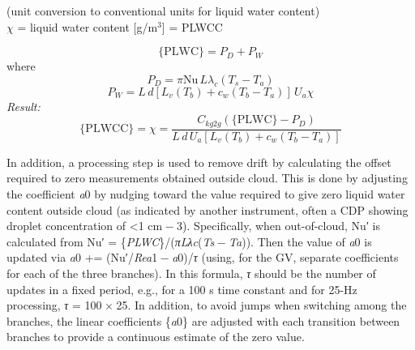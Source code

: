\documentclass[
]{book}
\begin{document}
\hspace*{0.333em}\hspace*{0.333em}\hspace*{0.333em}\hspace*{0.333em}\hspace*{0.333em}\hspace*{0.333em}\hspace*{0.333em}\hspace*{0.333em}\hspace*{0.333em}\hspace*{0.333em}(unit conversion to conventional units for liquid water content)\\
\(\chi\) = liquid water
content {[}g/m\(^{3}\){]} = PLWCC

\begin{equation}
\mathrm{\{PLWC\}} = P_{D}+P_{W}
\label{eq:PLWCa}
\end{equation}
where\\
\begin{equation}
P_{D}=\pi\mathrm{Nu}\,L\lambda_{c}(T_{s}-T_{a})
\label{eq:PLWCb}
\end{equation}
\begin{equation}
P_{W}=L\,d[L_{v}(T_{b})+c_{w}(T_{b}-T_{a})]\,U_{a}\chi
\label{eq:PLWCc}
\end{equation}
\emph{Result:}\\
\begin{equation}
\mathrm{\{PLWCC\}}=\chi=\frac{C_{kg2g}(\mathrm{\{PLWC\}}-P_{D})}{L\,d\,U_{a}[L_{v}(T_{b})+c_{w}(T_{b}-T_{a})]}
\label{eq:PLWCd}
\end{equation}

In addition, a processing step is used to remove drift by calculating the offset required to zero measurements obtained outside cloud. This is done by adjusting the coefficient {\emph{a}0} by nudging toward the value required to give zero liquid water content outside cloud (as indicated by another instrument, often a CDP showing droplet concentration of \textless1 cm{ − 3}). Specifically, when out-of-cloud, Nu{′} is calculated from Nu{′ = \{\emph{PLWC}\}/(\emph{πLλ}\emph{c}(\emph{T}\emph{s} − \emph{T}\emph{a}))}. Then the value of {\emph{a}0} is updated via {\emph{a}0} += (Nu{′/\emph{Re}\emph{a}1 − \emph{a}0)/\emph{τ}} (using, for the GV, separate coefficients for each of the three branches). In this formula, {\emph{τ}} should be the number of updates in a fixed period, e.g., for a 100 s time constant and for 25-Hz processing, {\emph{τ} = 100 × 25}. In addition, to avoid jumps when switching among the branches, the linear coefficients \{{\emph{a}0}\} are adjusted with each transition between branches to provide a continuous estimate of the zero value.
\end{document}
